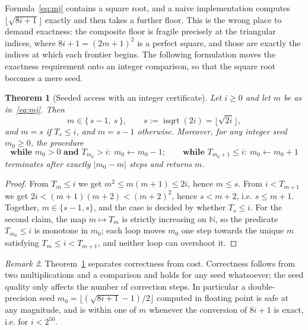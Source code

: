\documentclass[11pt,a4paper]{article}
\theoremstyle{plain}
\newtheorem{theorem}{Theorem}[section]
\theoremstyle{definition}
\theoremstyle{remark}
\newtheorem{remark}[theorem]{Remark}
\newcommand{\N}{\mathbb{N}}
\newcommand{\isqrt}{\operatorname{isqrt}}
\begin{document}
Formula~\eqref{eq:mj} contains a square root, and a naive implementation
computes $\lfloor \sqrt{8i+1} \rfloor$ exactly and then takes a further floor.
This is the wrong place to demand exactness: the composite floor is fragile
precisely at the triangular indices, where $8i+1 = (2m+1)^2$ is a perfect
square, and those are exactly the indices at which each frontier begins. The
following formulation moves the exactness requirement onto an integer
comparison, so that the square root becomes a mere seed.

\begin{theorem}[Seeded access with an integer certificate]\label{thm:seed}
Let $i \ge 0$ and let $m$ be as in~\eqref{eq:mj}. Then
\begin{equation}\label{eq:twocand}
  m \in \bigl\{\, s-1,\ s \,\bigr\}, \qquad s := \isqrt(2i) = \lfloor \sqrt{2i} \rfloor,
\end{equation}
and $m = s$ if $T_s \le i$, and $m = s-1$ otherwise. Moreover, for
\emph{any} integer seed $m_0 \ge 0$, the procedure
\[
  \textbf{while } m_0 > 0 \textbf{ and } T_{m_0} > i:\ m_0 \gets m_0 - 1;
  \qquad
  \textbf{while } T_{m_0+1} \le i:\ m_0 \gets m_0 + 1
\]
terminates after exactly $|m_0 - m|$ steps and returns $m$.
\end{theorem}

\begin{proof}
From $T_m \le i$ we get $m^2 \le m(m+1) \le 2i$, hence $m \le s$. From
$i < T_{m+1}$ we get $2i < (m+1)(m+2) < (m+2)^2$, hence $s < m+2$, i.e.
$s \le m+1$. Together, $m \in \{s-1, s\}$, and the case is decided by whether
$T_s \le i$. For the second claim, the map $m \mapsto T_m$ is strictly
increasing on $\N$, so the predicate $T_{m_0} \le i$ is monotone in $m_0$; each
loop moves $m_0$ one step towards the unique $m$ satisfying
$T_m \le i < T_{m+1}$, and neither loop can overshoot it.
\end{proof}

\begin{remark}
Theorem~\ref{thm:seed} separates correctness from cost. Correctness follows from
two multiplications and a comparison and holds for any seed whatsoever; the seed
quality only affects the number of correction steps. In particular a
double-precision seed $m_0 = \lfloor(\sqrt{8i+1}-1)/2\rfloor$ computed in
floating point is safe at any magnitude, and is within one of $m$ whenever the
conversion of $8i+1$ is exact, i.e. for $i < 2^{50}$.
\end{remark}
\end{document}
